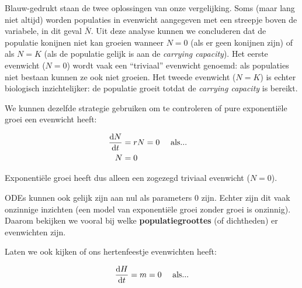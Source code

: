 \documentclass[
  a4paper,
]{scrbook}
\theoremstyle{definition}
\theoremstyle{remark}
\newcounter{quartocalloutnteno}
\newcommand{\quartocalloutnte}[1]{\refstepcounter{quartocalloutnteno}\label{#1}}
\begin{document}
Blauw-gedrukt staan de twee oplossingen van onze vergelijking. Soms
(maar lang niet altijd) worden populaties in evenwicht aangegeven met
een streepje boven de variabele, in dit geval \(\bar{N}\). Uit deze
analyse kunnen we concluderen dat de populatie konijnen niet kan groeien
wanneer \(N=0\) (als er geen konijnen zijn) of als \(N=K\) (als de
populatie gelijk is aan de \emph{carrying capacity}). Het eerste
evenwicht (\(N=0\)) wordt vaak een ``triviaal'' evenwicht genoemd: als
populaties niet bestaan kunnen ze ook niet groeien. Het tweede evenwicht
(\(N=K\)) is echter biologisch inzichtelijker: de populatie groeit
totdat de \emph{carrying capacity} is bereikt.

We kunnen dezelfde strategie gebruiken om te controleren of pure
exponentiële groei een evenwicht heeft:

\begin{align*}
    \mathchoice{\frac{\mathrm{d}N}
{\mathrm{d}t}}{\mathrm{d}N/\mathrm{d}t}
{\mathrm{d}N/\mathrm{d}t}
{\mathrm{d}N/\mathrm{d}t} &= rN = 0 \quad \text{ als...}\\
    N &= 0 &
\end{align*}

Exponentiële groei heeft dus alleen een zogezegd triviaal evenwicht
(\(N = 0\)).

\begin{tcolorbox}[enhanced jigsaw, rightrule=.15mm, opacityback=0, leftrule=.75mm, title=\textcolor{quarto-callout-caution-color}{\faFire}\hspace{0.5em}{Note \ref*{nte-parsnul}: Parameters zijn niet nul}, toptitle=1mm, titlerule=0mm, opacitybacktitle=0.6, colframe=quarto-callout-caution-color-frame, breakable, colbacktitle=quarto-callout-caution-color!10!white, coltitle=black, toprule=.15mm, bottomrule=.15mm, left=2mm, bottomtitle=1mm, arc=.35mm, colback=white]

\quartocalloutnte{nte-parsnul} 

ODEs kunnen ook gelijk zijn aan nul als parameters 0 zijn. Echter zijn
dit vaak onzinnige inzichten (een model van exponentiële groei zonder
groei is onzinnig). Daarom bekijken we vooral bij welke
\textbf{populatiegroottes} (of dichtheden) er evenwichten zijn.

\end{tcolorbox}

Laten we ook kijken of ons hertenfeestje evenwichten heeft:

\begin{align*}
    \mathchoice{\frac{\mathrm{d}H}
{\mathrm{d}t}}{\mathrm{d}H/\mathrm{d}t}
{\mathrm{d}H/\mathrm{d}t}
{\mathrm{d}H/\mathrm{d}t} &= m = 0 \quad \text{ als...}\\
\end{align*}
\end{document}
